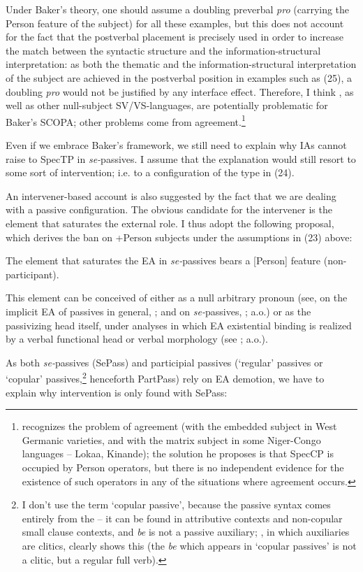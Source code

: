 \documentclass[output=paper]{langsci/langscibook}
\begin{document}
Under Baker’s theory, one should assume a doubling preverbal \textit{pro} (carrying the Person feature of the subject) for all these examples, but this does not account for the fact that the postverbal placement is precisely used in order to increase the match between the syntactic structure and the information-structural interpretation: as both the thematic and the information-structural interpretation of the subject are achieved in the postverbal position in examples such as (25), a doubling \textit{pro} would not be justified by any interface effect. Therefore, I think , as well as other null-subject SV\slash VS-languages, are potentially problematic for Baker’s SCOPA; other problems come from  agreement.\footnote{\citet{Baker2008} recognizes the problem of  agreement (with the embedded subject in West Germanic varieties, and with the matrix subject in some Niger-Congo languages – Lokaa, Kinande); the solution he proposes is that SpecCP is occupied by Person operators, but there is no independent evidence for the existence of such operators in any of the situations where  agreement occurs.}

  Even if we embrace Baker’s framework, we still need to explain why IAs cannot raise to SpecTP in \textit{se-}passives. I assume that the explanation would still resort to some sort of intervention; i.e. to a configuration of the type in (24). 

  An intervener-based account is also suggested by the fact that we are dealing with a passive configuration. The obvious candidate for the intervener is the element that saturates the external role. I thus adopt the following proposal, which derives the ban on +Person subjects under the assumptions in (23) above:

\ea%
    \label{ex:giurgea:26}
    The element that saturates the EA in \textit{se-}passives bears a [Person] feature (non-participant).
\z

This element can be conceived of either as a null arbitrary pronoun (see, on the implicit EA of passives in general, \citealt{Collins2005,Landau2010Explicit}; and on  \textit{se-}passives, \citealt{MacDonald2017}; a.o.) or as the passivizing head itself, under analyses in which EA existential binding is realized by a verbal functional head or verbal morphology (see \citealt{Baker1989Passive,Bruening2012}; a.o.).

As both \textit{se-}passives (SePass) and participial passives (‘regular' passives or ‘copular' passives,\footnote{I don’t use the term ‘copular passive', because the passive syntax comes entirely from the  – it can be found in attributive contexts and non-copular small clause contexts, and \textit{be} is not a passive auxiliary; , in which auxiliaries are clitics, clearly shows this (the \textit{be} which appears in ‘copular passives' is not a clitic, but a regular full verb).} henceforth PartPass) rely on EA demotion, we have to explain why intervention is only found with SePass:
\end{document}

